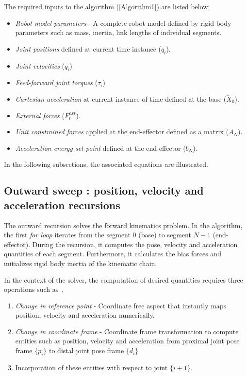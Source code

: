 The required inputs to the algorithm (\ref{Algorithm1}) are listed below;
\begin{itemize}
	\item \textit{Robot model parameters} - A complete robot model defined by rigid body parameters such as mass, inertia, link lengths of individual segments.
	\item \textit{Joint positions} defined at current time instance ($q_i$).
	\item \textit{Joint velocities} ($\dot{q}_i$)
	\item \textit{Feed-forward joint torques} ($\tau_i$)
	\item \textit{Cartesian acceleration} at current instance of time defined at the base ($\ddot{X}_0$).
	\item \textit{External forces} ($F^{ext}_i$).
	\item \textit{Unit constrained forces} applied at the end-effector defined as a matrix ($A_N$).
	\item \textit{Acceleration energy set-point} defined at the end-effector ($b_N$).
\end{itemize}

In the following subsections, the associated equations are illustrated.

\subsection{Outward sweep : position, velocity and acceleration recursions}
The outward recursion solves the forward kinematics problem. In the algorithm, the first \textit{for loop} iterates from the segment $0$ (base) to segment $N-1$ (end-effector). During the recursion, it computes the pose, velocity and acceleration quantities of each segment. Furthermore, it calculates the bias forces and initializes rigid body inertia of the kinematic chain. 

In the context of the solver, the computation of desired quantities requires three operations such as~\cite{shakhimardanov2015composable}, 
\begin{enumerate}
	\item \textit{Change in reference point} - Coordinate free aspect that instantly maps position, velocity and acceleration numerically.
	\item \textit{Change in coordinate frame} - Coordinate frame transformation to compute entities such as position, velocity and acceleration from proximal joint pose frame $\{p_i\}$ to distal joint pose frame $\{d_i\}$
	\item Incorporation of these entities with respect to joint $\{i+1\}$.
\end{enumerate}

